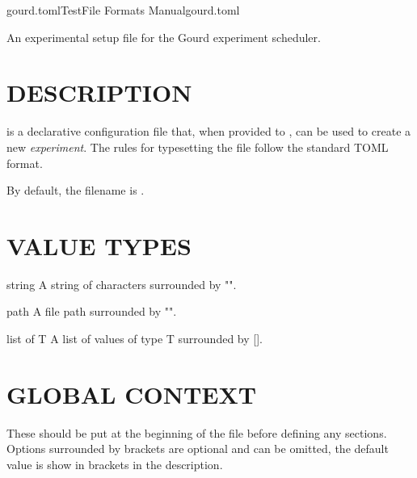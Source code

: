 \documentclass[a4paper,english]{article}
\begin{document}
  \pagestyle{fancy}

  \begin{Name}{5}{gourd.toml}{Test}{File Formats Manual}{gourd.toml}
\begin{adjustwidth}{18pt}{0pt}

       \- An experimental setup file for the Gourd experiment scheduler.

\end{adjustwidth}
  \end{Name}

\begin{adjustwidth}{18pt}{0pt}

  \section{DESCRIPTION}

      \noindent {} is a declarative configuration file that,
      when provided to , can be used to create a new \emph{experiment}.
      The rules for typesetting the file follow the standard TOML format.

      By default, the filename is .

  \section{VALUE TYPES}

    \begin{Description}[Types]\setlength{\itemsep}{0cm}
        \item[string] A string of characters surrounded by "".
        \item[path] A file path surrounded by "".
        \item[list of T] A list of values of type T surrounded by [].
    \end{Description}

  \section{GLOBAL CONTEXT}

    These should be put at the beginning of the file before defining any sections.
    Options surrounded by brackets are optional and can be omitted, the default value is show in brackets in the description.


\end{adjustwidth}
\end{document}
